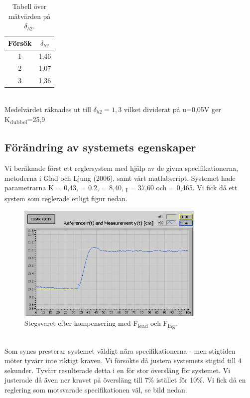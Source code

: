 \documentclass{article}
\begin{document}
\begin{table}[ht] 
\centering 
\begin{tabular}{c c} 
Försök & $\delta_{h2}$ \\ [0.5ex] %
\hline
1 & 1,46 \\
2 & 1,07 \\
3 & 1,36 \\

\end{tabular} 
\caption{Tabell över mätvärden på $\delta_{h2}$.}
\end{table}
~\\ %
Medelvärdet räknades ut till $\delta_{h2}=1,3$ vilket dividerat på u=0,05V ger K\textsubscript{dubbel}=25,9
\newpage

\subsection{Förändring av systemets egenskaper}

Vi beräknade först ett reglersystem med hjälp av de givna specifikationerna, metoderna i Glad och Ljung (2006), samt vårt matlabscript. Systemet hade parametrarna K = 0,43, \textbeta = 0.2,  = 8,40, {\textsubscript{I}} = 37,60 och \textgamma = 0,465. Vi fick då ett system som reglerade enligt figur nedan. 

\begin{figure}[ht!]
\centering
\includegraphics[width=90mm]{Test1_cut.jpg}
\caption{Stegsvaret efter kompensering med F\textsubscript{lead} och F\textsubscript{lag}.}
\label{overflow}
\end{figure}
~\\
Som synes presterar systemet väldigt nära specifikationerna - men stigtiden möter tyvärr inte riktigt kraven. Vi försökte då justera systemets stigtid till 4 sekunder. Tyvärr resulterade detta i en för stor översläng för systemet. Vi justerade då även ner kravet på översläng till 7\% istället för 10\%. Vi fick då en reglering som motsvarade specifikationen väl, se bild nedan. 
\end{document}
